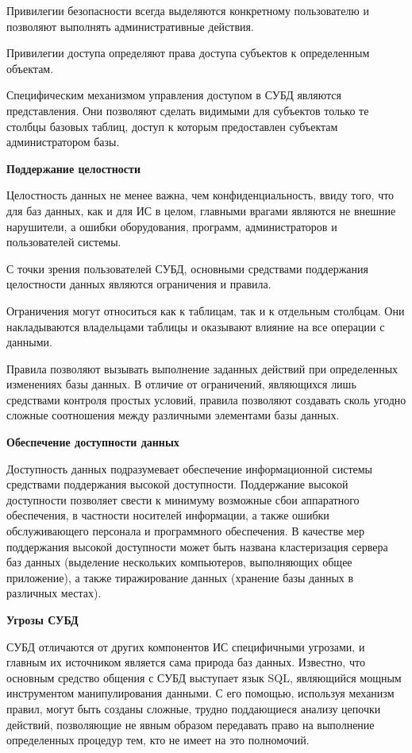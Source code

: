 Привилегии безопасности всегда выделяются конкретному пользователю и позволяют выполнять административные действия.

Привилегии доступа определяют права доступа субъектов к определенным объектам.

Специфическим механизмом управления доступом в СУБД являются представления. Они позволяют сделать
видимыми для субъектов только те столбцы базовых таблиц, доступ к которым предоставлен субъектам администратором базы.

\bigbreak
\textbf{Поддержание целостности}

Целостность данных не менее важна, чем конфиденциальность, ввиду того, что для баз данных, как и для
ИС в целом, главными врагами являются не внешние нарушители, а ошибки оборудования, программ, администраторов и
пользователей системы.

С точки зрения пользователей СУБД, основными средствами поддержания целостности данных являются ограничения и правила.

Ограничения могут относиться как к таблицам, так и к отдельным столбцам. Они накладываются владельцами
таблицы и оказывают влияние на все операции с данными.

Правила позволяют вызывать выполнение заданных действий при определенных изменениях базы данных.
В отличие от ограничений, являющихся лишь средствами контроля простых условий, правила позволяют
создавать сколь угодно сложные соотношения между различными элементами базы данных.

\bigbreak
\textbf{Обеспечение доступности данных}

Доступность данных подразумевает обеспечение информационной системы средствами поддержания высокой
доступности. Поддержание высокой доступности позволяет свести к минимуму возможные сбои аппаратного
обеспечения, в частности носителей информации, а также ошибки обслуживающего персонала и программного
обеспечения. В качестве мер поддержания высокой доступности может быть названа кластеризация сервера баз
данных (выделение нескольких компьютеров, выполняющих общее приложение), а также тиражирование данных
(хранение базы данных в различных местах).

\bigbreak
\textbf{Угрозы СУБД}

СУБД отличаются от других компонентов ИС специфичными угрозами, и главным их источником является
сама природа баз данных. Известно, что основным средство общения с СУБД выступает язык SQL,
являющийся мощным инструментом манипулирования данными. С его помощью, используя механизм правил, могут
быть созданы сложные, трудно поддающиеся анализу цепочки действий, позволяющие не явным образом передавать
право на выполнение определенных процедур тем, кто не имеет на это полномочий.

